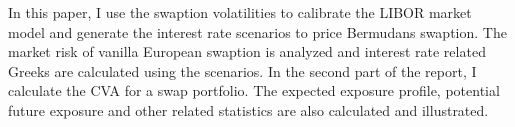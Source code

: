\begin{EnAbstract}
In this paper, I use the swaption volatilities to calibrate the LIBOR market model and generate the interest rate scenarios to price Bermudans swaption. The market risk of vanilla European swaption is analyzed and interest rate related Greeks are calculated using the scenarios. In the second part of the report, I calculate the CVA for a swap portfolio. The expected exposure profile, potential future exposure and other related statistics are also calculated and illustrated.
\end{EnAbstract} 